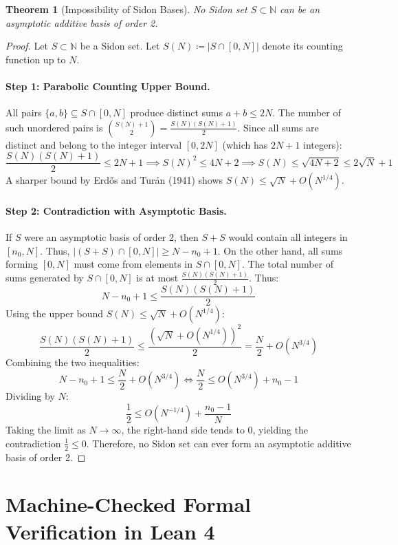 \documentclass[11pt,a4paper]{article}
\newtheorem{theorem}{Theorem}[section]
\theoremstyle{definition}
\begin{document}
\begin{theorem}[Impossibility of Sidon Bases]\label{thm:sidon_not_basis}
No Sidon set $S \subset \mathbb{N}$ can be an asymptotic additive basis of order 2.
\end{theorem}

\begin{proof}
Let $S \subset \mathbb{N}$ be a Sidon set. Let $S(N) \coloneqq |S \cap [0, N]|$ denote its counting function up to $N$.
\paragraph{Step 1: Parabolic Counting Upper Bound.}
All pairs $\{a, b\} \subseteq S \cap [0, N]$ produce distinct sums $a + b \le 2N$.
The number of such unordered pairs is $\binom{S(N)+1}{2} = \frac{S(N)(S(N)+1)}{2}$.
Since all sums are distinct and belong to the integer interval $[0, 2N]$ (which has $2N + 1$ integers):
\[ \frac{S(N)(S(N)+1)}{2} \le 2N + 1 \implies S(N)^2 \le 4N + 2 \implies S(N) \le \sqrt{4N + 2} \le 2 \sqrt{N} + 1 \]
A sharper bound by Erd\H{o}s and Tur\'an (1941) shows $S(N) \le \sqrt{N} + O(N^{1/4})$.

\paragraph{Step 2: Contradiction with Asymptotic Basis.}
If $S$ were an asymptotic basis of order 2, then $S + S$ would contain all integers in $[n_0, N]$.
Thus, $|(S + S) \cap [0, N]| \ge N - n_0 + 1$.
On the other hand, all sums forming $[0, N]$ must come from elements in $S \cap [0, N]$.
The total number of sums generated by $S \cap [0, N]$ is at most $\frac{S(N)(S(N)+1)}{2}$.
Thus:
\[ N - n_0 + 1 \le \frac{S(N)(S(N)+1)}{2} \]
Using the upper bound $S(N) \le \sqrt{N} + O(N^{1/4})$:
\[ \frac{S(N)(S(N)+1)}{2} \le \frac{(\sqrt{N} + O(N^{1/4}))^2}{2} = \frac{N}{2} + O(N^{3/4}) \]
Combining the two inequalities:
\[ N - n_0 + 1 \le \frac{N}{2} + O(N^{3/4}) \iff \frac{N}{2} \le O(N^{3/4}) + n_0 - 1 \]
Dividing by $N$:
\[ \frac{1}{2} \le O(N^{-1/4}) + \frac{n_0 - 1}{N} \]
Taking the limit as $N \to \infty$, the right-hand side tends to $0$, yielding the contradiction $\frac{1}{2} \le 0$.
Therefore, no Sidon set can ever form an asymptotic additive basis of order 2.
\end{proof}

\section{Machine-Checked Formal Verification in Lean 4}
\end{document}
